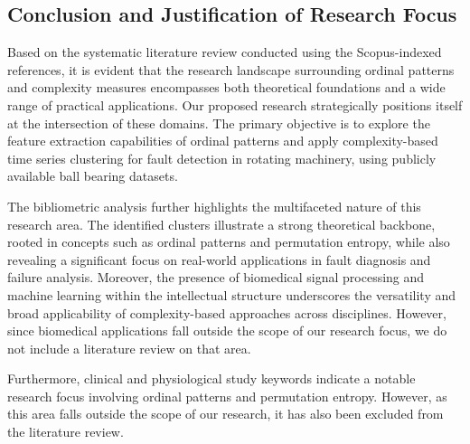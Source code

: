 \subsection{Conclusion and Justification of Research Focus}

Based on the systematic literature review conducted using the Scopus-indexed references, it is evident that the research landscape surrounding ordinal patterns and complexity measures encompasses both theoretical foundations and a wide range of practical applications. Our proposed research strategically positions itself at the intersection of these domains. 
The primary objective is to explore the feature extraction capabilities of ordinal patterns and apply complexity-based time series clustering for fault detection in rotating machinery, using publicly available ball bearing datasets.

The bibliometric analysis further highlights the multifaceted nature of this research area. The identified clusters illustrate a strong theoretical backbone, rooted in concepts such as ordinal patterns and permutation entropy, while also revealing a significant focus on real-world applications in fault diagnosis and failure analysis. Moreover, the presence of biomedical signal processing and machine learning within the intellectual structure underscores the versatility and broad applicability of complexity-based approaches across disciplines. However, since biomedical applications fall outside the scope of our research focus, we do not include a literature review on that area.

Furthermore, clinical and physiological study keywords indicate a notable research focus involving ordinal patterns and permutation entropy. However, as this area falls outside the scope of our research, it has also been excluded from the literature review.



